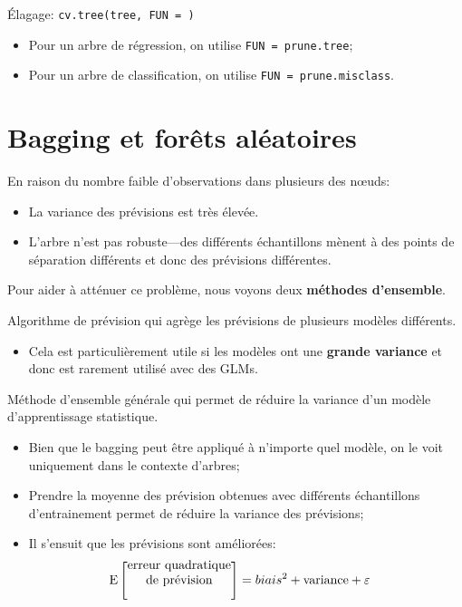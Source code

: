\documentclass[10pt, french]{article}
\begin{document}
\begin{multicols*}{3}
\begin{definitionNOHFILLsub}
Élagage: \texttt{cv.tree(tree, FUN = )}
\begin{itemize}
	\item	Pour un arbre de régression, on utilise \texttt{FUN = prune.tree};
	\item	Pour un arbre de classification, on utilise \texttt{FUN = prune.misclass}.
\end{itemize}
\end{definitionNOHFILLsub}

\newpage

\section{Bagging et forêts aléatoires}
En raison du nombre faible d'observations dans plusieurs des nœuds:
\begin{itemize}[leftmargin = *]
	\item	La variance des prévisions est très élevée.
	\item	L'arbre n'est pas robuste---des différents échantillons mènent à des points de séparation différents et donc des prévisions différentes.
\end{itemize}

Pour aider à atténuer ce problème, nous voyons deux \textbf{méthodes d'ensemble}.
\begin{definitionNOHFILL}
Algorithme de prévision qui agrège les prévisions de plusieurs modèles différents.

\begin{itemize}[leftmargin = *]
\item	Cela est particulièrement utile si les modèles ont une \textbf{grande variance} et donc est rarement utilisé avec des GLMs.
\end{itemize}
\end{definitionNOHFILL}

\begin{definitionNOHFILLsub}[Bagging]
Méthode d'ensemble générale qui permet de réduire la variance d'un modèle d'apprentissage statistique.
\begin{itemize}[leftmargin = *]
	\item	Bien que le bagging peut être appliqué à n'importe quel modèle, on le voit uniquement dans le contexte d'arbres;
	\item	Prendre la moyenne des prévision obtenues avec différents échantillons d'entrainement permet de réduire la variance des prévisions;
	\item	Il s'ensuit que les prévisions sont améliorées: 
	\setlength{\mathindent}{-1.5cm}
		\begin{align*}
		\text{E}\left[\shortstack{erreur quadratique\\ de prévision}\right]
		&=	biais^{2} + \text{variance} + \varepsilon
		\end{align*}
	\setlength{\mathindent}{1cm}
\end{itemize}
\end{definitionNOHFILLsub}


\end{multicols*}
\end{document}
